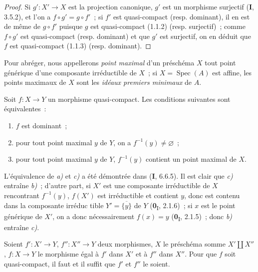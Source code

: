 \begin{proof}
Si $g':X'\to X$ est la projection canonique, $g'$ est un morphisme surjectif
(\textbf{I}, 3.5.2), et l'on a $f\circ g'=g\circ f'$~; si $f'$ est quasi-compact
(resp. dominant), il en est de même de $g\circ f'$ puisque $g$ est
quasi-compact (1.1.2) (resp. surjectif)~; comme $f\circ g'$ est quasi-compact
(resp. dominant) et que $g'$ est surjectif, on en déduit que $f$ est
quasi-compact (1.1.3) (resp. dominant).
\end{proof}

Pour abréger, nous appellerons \emph{point maximal} d'un préschéma $X$ tout
point générique d'une composante irréductible de $X$~; si
$X=\operatorname{Spec}(A)$ est affine, les points maximaux de $X$ sont les
\emph{idéaux premiers minimaux} de $A$.

\begin{proposition}[1.1.5]
\label{IV.1.1.5-fr}
Soit $f:X\to Y$ un morphisme quasi-compact. Les conditions suivantes sont
équivalentes~:
\begin{enumerate}
  \item[\textup{a)}] $f$ est dominant~;
  \item[\textup{b)}] pour tout point maximal $y$ de $Y$, on a
  $f^{-1}(y)\neq\varnothing$~;
  \item[\textup{c)}] pour tout point maximal $y$ de $Y$, $f^{-1}(y)$ contient un point
  maximal de $X$.
\end{enumerate}
\end{proposition}

L'équivalence de \emph{a)} et \emph{c)} a été démontrée dans (\textbf{I}, 6.6.5). Il
est clair que \emph{c)} entraîne \emph{b)}~; d'autre part, si $X'$ est une
composante irréductible de $X$ rencontrant $f^{-1}(y)$, $f(X')$ est
irréductible et contient $y$, donc est contenu dans la composante irréduc%
tible
$Y'=\overline{\{y\}}$ de $Y$ (\textbf{0}\textsubscript{I}, 2.1.6)~; si $x$ est le
point générique de $X'$, on a donc nécessairement $f(x)=y$
(\textbf{0}\textsubscript{I}, 2.1.5)~; donc \emph{b)} entraîne \emph{c)}.

\begin{proposition}[1.1.6]
\label{IV.1.1.6-fr}
Soient $f':X'\to Y$, $f'':X''\to Y$ deux morphismes, $X$ le préschéma somme
$X'\amalg X''$, $f:X\to Y$ le morphisme égal à $f'$ dans $X'$ et à $f''$
dans $X''$. Pour que $f$ soit quasi-compact, il faut et il suffit que $f'$ et
$f''$ le soient.
\end{proposition}

